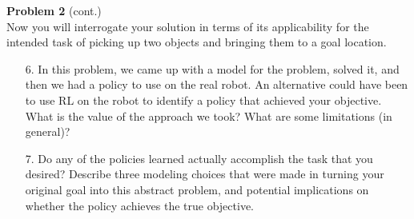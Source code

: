 \documentclass[submit]{../harvardml}
\begin{document}
\newpage 

\begin{framed}
\textbf{Problem 2} (cont.)\\

Now you will interrogate your solution in terms of its applicability
for the intended task of picking up two objects and bringing them to a
goal location.

\begin{itemize}

  \item[6.] In this problem, we came up with a model for the problem,
    solved it, and then we had a policy to use on the real robot.  An
    alternative could have been to use RL on the robot to identify a
    policy that achieved your objective.  What is the value of the
    approach we took?  What are some limitations (in general)? 

  \item[7.] Do any of the policies learned actually accomplish the task
    that you desired? Describe three modeling choices that were made in
    turning your original goal into this abstract problem, and
    potential implications on whether the policy achieves the true objective.

\end{itemize}

\end{framed}

\newpage
\end{document}
